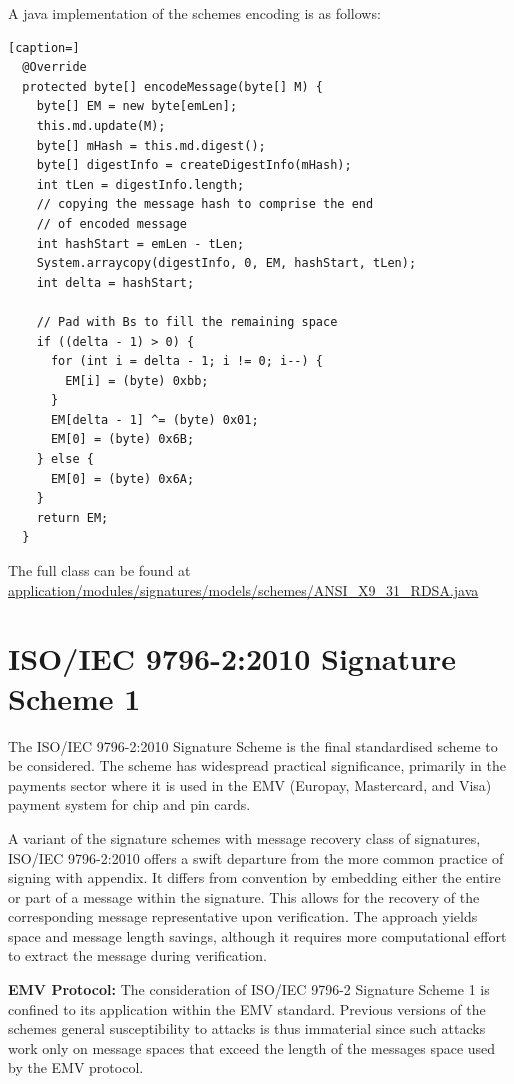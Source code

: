 \documentclass[]{final_report}
\theoremstyle{definition}
\begin{document}
A java implementation of the schemes encoding is as follows: 
\begin{lstlisting}[caption=]
  @Override
  protected byte[] encodeMessage(byte[] M) {
    byte[] EM = new byte[emLen];
    this.md.update(M);
    byte[] mHash = this.md.digest();
    byte[] digestInfo = createDigestInfo(mHash);
    int tLen = digestInfo.length;
    // copying the message hash to comprise the end
    // of encoded message
    int hashStart = emLen - tLen;
    System.arraycopy(digestInfo, 0, EM, hashStart, tLen);
    int delta = hashStart;

    // Pad with Bs to fill the remaining space
    if ((delta - 1) > 0) {
      for (int i = delta - 1; i != 0; i--) {
        EM[i] = (byte) 0xbb;
      }
      EM[delta - 1] ^= (byte) 0x01;
      EM[0] = (byte) 0x6B;
    } else {
      EM[0] = (byte) 0x6A;
    }
    return EM;
  }
\end{lstlisting}
The full class can be found at \url{application/modules/signatures/models/schemes/ANSI\_X9\_31\_RDSA.java}

\section{ISO/IEC 9796-2:2010 Signature Scheme 1}
The ISO/IEC 9796-2:2010 \cite{ISO/2010/9796-2-2010} Signature Scheme is the final standardised scheme to be considered. The scheme has widespread practical significance, primarily in the payments sector where it is used in the EMV (Europay, Mastercard, and Visa) payment system for chip and pin cards. 

A variant of the signature schemes with message recovery class of signatures, ISO/IEC 9796-2:2010 offers a swift departure from the more common practice of signing with appendix. It differs from convention by embedding either the entire or part of a message within the signature. This allows for the recovery of the corresponding message representative upon verification. The approach yields space and message length savings, although it requires more computational effort to extract the message during verification.

\textbf{EMV Protocol:} The consideration of ISO/IEC 9796-2 Signature Scheme 1 is confined to its application within the EMV standard. Previous versions of the schemes general susceptibility to attacks \cite{10.1007/3-540-48405-1_1, coron2016practical} is thus immaterial since such attacks work only on message spaces that exceed the length of the messages space used by the EMV protocol.
\end{document}
